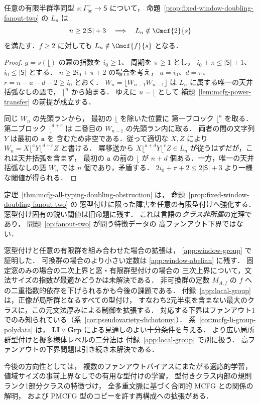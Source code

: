 \begin{theorem}[任意の固定有限型付けは括弧付き倍化族を救済できない]
\label{thm:mcfg-all-typing-doubling-obstruction}
任意の有限半群準同型
$s:\Gamma_{\mathrm{br}}^+\to\mathsf S$ について，
命題~\ref{prop:fixed-window-doubling-fanout-two} の $L_n$ は
\[
 n\ge2|\mathsf S|+3\quad\Longrightarrow\quad
 L_n\notin\Cmcf{2}{s}
\]
を満たす．$f\ge2$ に対しても
$L_n\notin\Cmcf{f}{s}$ となる．
\end{theorem}
\begin{proof}
$g=s(\lfloor)$ の冪の指数を $i_0\ge1$、
周期を $\pi\ge1$ とし，
$i_0+\pi\le|\mathsf S|+1$、$i_0\le|\mathsf S|$ とする．
$n\ge2i_0+\pi+2$ の場合を考え，
$a=i_0$、$d=\pi$、
$r=n-a-d-2\ge i_0$ とおく．
$W_n=\lfloor W_{n-1}W_{n-1}\rfloor$ は
$L_n$ に属する唯一の天井括弧なしの語で，
$\lfloor^n$ から始まる．
ゆえに $u=\lfloor$ として
補題~\ref{lem:mcfg-power-transfer} の前提が成立する．

同じ $W_n$ の先頭ランから，
最初の $\lfloor$ を除いた位置に
第一ブロック $\lfloor^a$ を取る．
第二ブロック $\lfloor^{d+r}$ は
二番目の $W_{n-1}$ の先頭ラン内に取る．
両者の間の文字列 $Y$ は最初の $\mathtt a$ を
含むため非空である．従って適切な $X,Z$ により
$W_n=X\lfloor^aY\lfloor^{d+r}Z$ と書ける．
冪移送から
$X\lfloor^{a+d}Y\lfloor^rZ\in L_n$
が従うはずだが，これは天井括弧を含まず，
最初の $\mathtt a$ の前の $\lfloor$ が
$n+d$ 個ある．一方，唯一の天井括弧なしの語
$W_n$ では $n$ 個であり，矛盾する．
$2i_0+\pi+2\le2|\mathsf S|+3$ より一様な閾値が得られる．
\end{proof}

\begin{remark}
定理~\ref{thm:mcfg-all-typing-doubling-obstruction} は，
命題~\ref{prop:fixed-window-doubling-fanout-two} の
窓型付けに限った障害を任意の有限型付けへ強化する．
窓型付け固有の鋭い閾値は旧命題に残す．
これは言語の\emph{クラス非所属}の定理であり，
問題~\ref{op:fanout-two} が問う特徴データの
高ファンアウト下界ではない．
\end{remark}

窓型付けと任意の有限群を組み合わせた場合の拡張は，
\ref{app:window-group} で証明した．
可換群の場合のより小さい定数は
\ref{app:window-abelian} に残す．
固定窓のみの場合の二次上界と窓・有限群型付けの場合の
三次上界について，文法サイズの指数が最適かどうかは未解決である．
非可換群の定数 $M_{A,f}$ の $f$ への二重指数的依存を下げられるかも今後の課題である．
付録~\ref{app:local-group} は，正像が局所群となるすべての型付け，
すなわち2元半束を含まない最大のクラスに，この元文法厚みによる制御を拡張する．
対応する下界はファンアウト1でのみ知られている（系~\ref{cor:pseudovariety-dichotomy}）．
系~\ref{cor:mcfg-li-group-polydata} は，
$\mathbf{LI}\vee\mathbf{Grp}$ による見通しのよい十分条件を与える．
より広い局所群型付けと擬多様体レベルの二分法は
付録~\ref{app:local-group} で別に扱う．
高ファンアウトの下界問題は引き続き未解決である．

今後の方向性としては，
複数のファンアウトバイアスにまたがる適応的学習，
値域サイズの事前上界なしでの有用な型付けの学習，
型付きクラス内部の規則ランク1部分クラスの特徴づけ，
全多重文脈に基づく合同的 MCFG との関係の解明，
および PMCFG 型のコピーを許す再構成への拡張がある．

